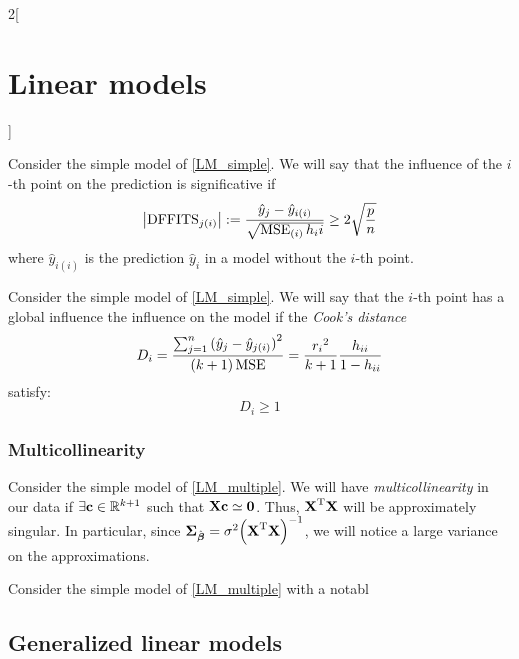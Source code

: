 \documentclass[../../../main_math.tex]{subfiles}
\begin{document}
\begin{multicols}{2}[\section{Linear models}]
\begin{definition}
  \end{definition}
  \begin{definition}
    Consider the simple model of \cref{LM_simple}. We will say that the influence of the $i$-th point on the prediction is significative if $$\abs{\mathrm{DFFITS}_{j(i)}}:=\frac{\hat{y}_j-\hat{y}_{i(i)}}{\sqrt{\operatorname{MSE}_{(i)}h_ii}}\geq 2\sqrt{\frac{p}{n}}$$ where $\hat{y}_{i(i)}$ is the prediction $\hat{y}_{i}$ in a model without the $i$-th point.
  \end{definition}
  \begin{definition}
    Consider the simple model of \cref{LM_simple}. We will say that the $i$-th point has a global influence the influence on the model if the \emph{Cook's distance} $$D_i=\frac{\sum_{j=1}^n{(\hat{y}_j-\hat{y}_{j(i)})}^2}{(k+1)\operatorname{MSE}}=\frac{{r_i}^2}{k+1}\frac{h_{ii}}{1-h_{ii}}$$ satisfy: $$D_i\geq 1$$
  \end{definition}
  \subsubsection{Multicollinearity}
  \begin{definition}
    Consider the simple model of \cref{LM_multiple}. We will have \emph{multicollinearity} in our data if $\exists \boldsymbol{\mathrm{c}}\in\mathbb{R}^{k+1}$ such that $\boldsymbol{\mathrm{Xc}}\simeq \boldsymbol{\mathrm{0}}$. Thus, ${\boldsymbol{\mathrm{X}}}^{\mathrm{T}}\boldsymbol{\mathrm{X}}$ will be approximately singular. In particular, since $\boldsymbol{\mathrm{\Sigma}}_{\hat{\boldsymbol{\mathrm{\beta}}}}=\sigma^2{\left({\boldsymbol{\mathrm{X}}}^{\mathrm{T}}\boldsymbol{\mathrm{X}}\right)}^{-1}$, we will notice a large variance on the approximations.
  \end{definition}
  \begin{proposition}
    Consider the simple model of \cref{LM_multiple} with a notabl
  \end{proposition}
  \subsection{Generalized linear models}

\end{multicols}
\end{document}
